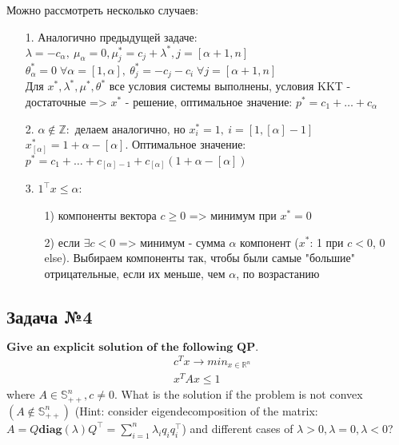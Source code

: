 \documentclass[12pt,letterpaper]{article}
\begin{document}
Можно рассмотреть несколько случаев:
\begin{itemize}
	\item[1.] Аналогично предыдущей задаче: $ \lambda = -c_{\alpha},\ \mu_{\alpha}= 0, \mu_j^* = c_j + \lambda^*, j = [\alpha+1, n] $ \\
$ \theta^*_{\alpha} = 0 \; \forall \alpha = [1, \alpha],\ \theta^*_j = -c_j-c_{i} \; \forall j = [\alpha + 1, n] $\\

Для $ x^*, \lambda^*, \mu^*, \theta^* $ все условия системы выполнены, условия KKT - достаточные => $ x^* $ - решение, оптимальное значение: $ p^* = c_1 + \ldots + c_{\alpha} $ \\
	\item[2.] $\alpha \notin \mathbb{Z}:$ делаем аналогично, но $x^*_i = 1,\ i = [1, [\alpha] - 1] $ $ x^*_{[\alpha]} = 1 + \alpha - \left[ \alpha \right] $.
Оптимальное значение: $ p^* = c_1 + \ldots + c_{\left[\alpha \right] - 1} + c_{\left[\alpha \right]} \left( 1 + \alpha - \left[ \alpha \right]  \right) $
	\item[3.] $1^{\top} x \leq \alpha:$ 
	\begin{itemize}
		\item[1)] компоненты вектора $ c\geq 0$ => минимум при $ x^* = 0 $
		\item[2)] если $\exists c<0$ => минимум - сумма $ \alpha $ компонент ($x^*$: 1 при $c<0$, 0 else). Выбираем компоненты так, чтобы были самые "большие" отрицательные, если их меньше, чем $ \alpha $, по возрастанию
	\end{itemize}
\end{itemize}



\subsection*{Задача №4}
$\textbf{Give an explicit solution of the following QP.}$
$$ 
\begin{aligned}
&c^Tx\rightarrow min_{x\in \mathbb{R}^n}\\ 
&x^TAx\leqslant1
\end{aligned}
$$
where \(A \in \mathbb{S}^n_{++}, c \neq 0\). What is the solution if the problem is not convex \((A \notin \mathbb{S}^n_{++})\) (Hint: consider eigendecomposition of the matrix: \(A = Q \mathbf{diag}(\lambda)Q^\top = \sum\limits_{i=1}^n \lambda_i q_i q_i^\top\)) and different cases of \(\lambda >0, \lambda=0, \lambda<0\)?\\
\end{document}

